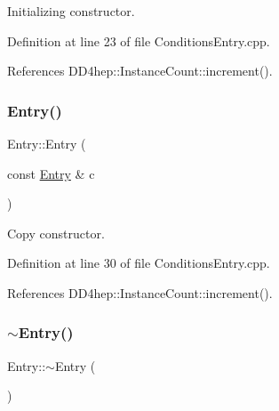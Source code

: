 Initializing constructor. 



Definition at line 23 of file Conditions\+Entry.\+cpp.



References D\+D4hep\+::\+Instance\+Count\+::increment().

\hypertarget{class_d_d4hep_1_1_conditions_1_1_entry_ae50bfee4f9aea43616b374050530cd57}{}\label{class_d_d4hep_1_1_conditions_1_1_entry_ae50bfee4f9aea43616b374050530cd57} 
\subsubsection{\texorpdfstring{Entry()}{Entry()}\hspace{0.1cm}{\footnotesize\ttfamily [3/3]}}
{\footnotesize\ttfamily Entry\+::\+Entry (\begin{DoxyParamCaption}\item[{const \hyperlink{class_d_d4hep_1_1_conditions_1_1_entry}{Entry} \&}]{c }\end{DoxyParamCaption})}



Copy constructor. 



Definition at line 30 of file Conditions\+Entry.\+cpp.



References D\+D4hep\+::\+Instance\+Count\+::increment().

\hypertarget{class_d_d4hep_1_1_conditions_1_1_entry_ace080276d727881acfee7197b85f0b65}{}\label{class_d_d4hep_1_1_conditions_1_1_entry_ace080276d727881acfee7197b85f0b65} 
\subsubsection{\texorpdfstring{$\sim$\+Entry()}{~Entry()}}
{\footnotesize\ttfamily Entry\+::$\sim$\+Entry (\begin{DoxyParamCaption}{ }\end{DoxyParamCaption})\hspace{0.3cm}{\ttfamily [virtual]}}



